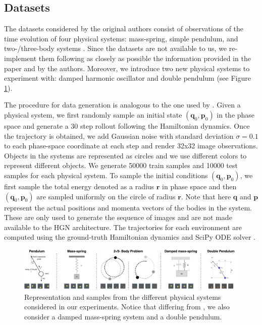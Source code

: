 \subsection{Datasets} \label{sec:data}

The datasets considered by the original authors consist of observations of the time evolution of four physical systems: mass-spring, simple pendulum, and two-/three-body systems \cite{hgn}. Since the datasets are not available to us, we re-implement them following as closely as possible the information provided in the paper and by the authors. Moreover, we introduce two new physical systems to experiment with: damped harmonic oscillator and double pendulum (see Figure \ref{fig:datasets}).

The procedure for data generation is analogous to the one used by \cite{hnn}. Given a physical system, we first randomly sample an initial state $(\bm{q}_0, \bm{p}_0)$ in the phase space and generate a $30$ step rollout following the Hamiltonian dynamics. Once the trajectory is obtained, we add Gaussian noise with standard deviation $\sigma = 0.1$ to each phase-space coordinate at each step and render 32x32 image observations. Objects in the systems are represented as circles and we use different colors to represent different objects. We generate 50000 train samples and 10000 test samples for each physical system. To sample the initial conditions $(\bm{q}_0, \bm{p}_0)$, we first sample the total energy denoted as a radius $\bm{r}$ in phase space and then $(\bm{q}_0, \bm{p}_0)$ are sampled uniformly on the circle of radius $\bm{r}$. Note that here $\bm{q}$ and $\bm{p}$ represent the actual positions and momenta vectors of the bodies in the system. These are only used to generate the sequence of images and are not made available to the HGN architecture. The trajectories for each environment are computed using the ground-truth Hamiltonian dynamics and SciPy ODE solver \cite{scipy}.

\begin{figure}
    \centering
    \includegraphics[width=\textwidth]{../openreview/pictures/data/new_dataset_image.png}
    \caption{Representation and samples from the different physical systems considered in our experiments. Notice that differing from \cite{hgn}, we also consider a damped mass-spring system and a double pendulum.}
    \label{fig:datasets}
\end{figure}
